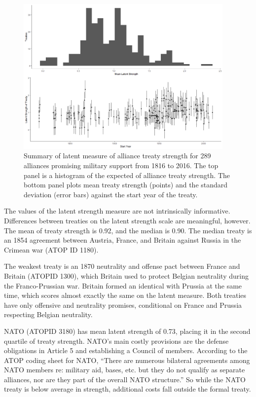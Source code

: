 \documentclass[12pt]{article}
\begin{document}
\begin{figure}
	\centering
		\includegraphics[width=0.95\textwidth]{../figures/ls-summary.png}
	\caption{Summary of latent measure of alliance treaty strength for 289 alliances promising military support from 1816 to 2016. The top panel is a histogram of the expected of alliance treaty strength. The bottom panel plots mean treaty strength (points) and the standard deviation (error bars) against the start year of the treaty.}
	\label{fig:ls-summary}
\end{figure}


The values of the latent strength measure are not intrinsically informative. 
Differences between treaties on the latent strength scale are meaningful, however. 
The mean of treaty strength is 0.92, and the median is 0.90. 
The median treaty is an 1854 agreement between Austria, France, and Britain against Russia in the Crimean war (ATOP ID 1180). 


The weakest treaty is an 1870 neutrality and offense pact between France and Britain (ATOPID 1300), which Britain used to protect Belgian neutrality during the Franco-Prussian war.  
Britain formed an identical with Prussia at the same time, which scores almost exactly the same on the latent measure. 
Both treaties have only offensive and neutrality promises, conditional on France and Prussia respecting Belgian neutrality. 


NATO (ATOPID 3180) has mean latent strength of 0.73, placing it in the second quartile of treaty strength. 
NATO's main costly provisions are the defense obligations in Article 5 and establishing a Council of members. 
According to the ATOP coding sheet for NATO, ``There are numerous bilateral agreements among NATO members re: military aid, bases, etc. but they do not qualify as separate alliances, nor are they part of the overall NATO structure.''
So while the NATO treaty is below average in strength, additional costs fall outside the formal treaty.    
\end{document}
